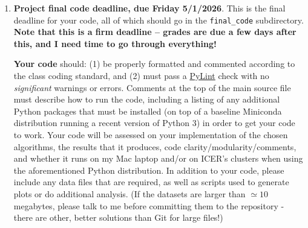 \documentclass[10pt]{article}
\begin{document}
\begin{enumerate}
\item \textbf{Project final code deadline, due Friday 5/1/2026}.  This
is the final deadline for your code, all of which should go in the
\texttt{final\_code} subdirectory.  \textbf{Note that this is a firm
deadline -- grades are due a few days after this, and I need time to
go through everything!}

\textbf{Your code} should: (1) be properly formatted and commented
according to the class coding standard, and (2) must pass a
\href{https://pypi.org/project/pylint/}{PyLint} check with no
\textit{significant} warnings or errors.  Comments at the top of the
main source file must describe how to run the code, including a
listing of any additional Python packages that must be installed (on
top of a baseline Miniconda distribution running a recent version of
Python 3) in order to get your code to work.  Your code will be
assessed on your implementation of the chosen algorithms, the results
that it produces, code clarity/modularity/comments, and whether it
runs on my Mac laptop and/or on ICER's clusters when using the
aforementioned Python distribution.  In addition to your code, please
include any data files that are required, as well as scripts used to
generate plots or do additional analysis.  (If the datasets are larger
than $\simeq 10$ megabytes, please talk to me before committing them
to the repository - there are other, better solutions than Git for
large files!)

\end{enumerate}

\vspace{3mm}
\end{document}
